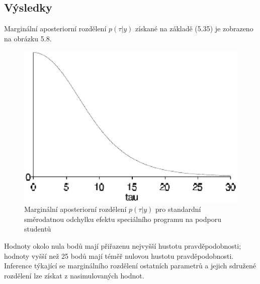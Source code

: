 \subsection{Výsledky}

Marginální aposteriorní rozdělení $p(\tau|y)$ získané na základě (5.35) je zobrazeno na obrázku 5.8.
\begin{figure}[htp]
\centering
\includegraphics[scale = 0.45]{pictures/fig_5_5.eps}
\caption{Marginální aposteriorní rozdělení $p(\tau | y)$ pro standardní směrodatnou odchylku efektu speciálního programu na podporu studentů}
\label{fig_5_5}
\end{figure}
Hodnoty okolo nula bodů mají přiřazenu nejvyšší hustotu pravděpodobnosti; hodnoty vyšší než 25 bodů mají téměř nulovou hustotu pravděpodobnosti. Inference týkající se marginálního rozdělení ostatních parametrů a jejich sdružené rozdělení lze získat z nasimulovaných hodnot.

